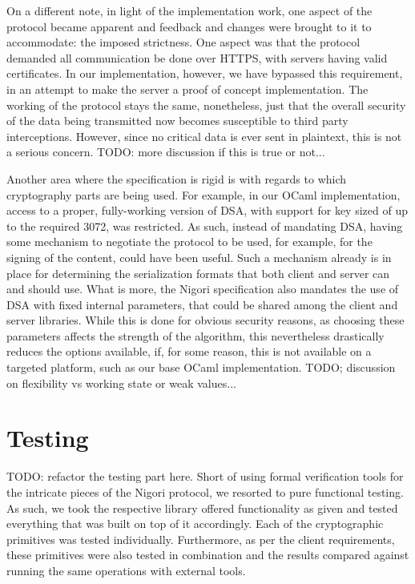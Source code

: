 On a different note, in light of the implementation work, one aspect of the protocol became apparent and feedback and changes were brought to it to accommodate: the imposed strictness.
One aspect was that the protocol demanded all communication be done over HTTPS, with servers having valid certificates.
In our implementation, however, we have bypassed this requirement, in an attempt to make the server a proof of concept implementation.
The working of the protocol stays the same, nonetheless, just that the overall security of the data being transmitted now becomes susceptible to third party interceptions.
However, since no critical data is ever sent in plaintext, this is not a serious concern.
TODO: more discussion if this is true or not...

Another area where the specification is rigid is with regards to which cryptography parts are being used.
For example, in our OCaml implementation, access to a proper, fully-working version of DSA, with support for key sized of up to the required 3072, was restricted.
As such, instead of mandating DSA, having some mechanism to negotiate the protocol to be used, for example, for the signing of the content, could have been useful.
Such a mechanism already is in place for determining the serialization formats that both client and server can and should use.
What is more, the Nigori specification also mandates the use of DSA with fixed internal parameters, that could be shared among the client and server libraries.
While this is done for obvious security reasons, as choosing these parameters affects the strength of the algorithm, this nevertheless drastically reduces the options available, if, for some reason, this is not available on a targeted platform, such as our base OCaml implementation.
TODO; discussion on flexibility vs working state or weak values...

\section{Testing}
TODO: refactor the testing part here.
Short of using formal verification tools for the intricate pieces of the Nigori protocol, we resorted to pure functional testing.
As such, we took the respective library offered functionality as given and tested everything that was built on top of it accordingly.
Each of the cryptographic primitives was tested individually.
Furthermore, as per the client requirements, these primitives were also tested in combination and the results compared against running the same operations with external tools.

